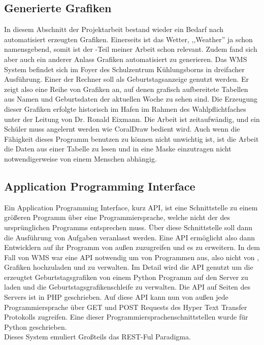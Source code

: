\subsection{Generierte Grafiken}
\label{sub:Generierte Grafiken}
In diesem Abschnitt der Projektarbeit bestand wieder ein Bedarf nach automatisiert erzeugten Grafiken.
Einerseits ist das Wetter, ,,Weather'' ja schon namensgebend, somit ist der \vs -Teil meiner Arbeit schon relevant.
Zudem fand sich aber auch ein anderer Anlass Grafiken automatisiert zu generieren.
Das WMS System befindet sich im Foyer des Schulzentrum Kühlungsborns in dreifacher Ausführung.
Einer der Rechner soll als Geburtstagsanzeige genutzt werden.
Er zeigt also eine Reihe von Grafiken an, auf denen grafisch aufbereitete Tabellen aus Namen und Geburtsdaten der aktuellen Woche zu sehen sind.
Die Erzeugung dieser Grafiken erfolgte historisch im Hafen im Rahmen des Wahlpflichtfaches unter der Leitung von Dr. Ronald Eixmann.
Die Arbeit ist zeitaufwändig, und ein Schüler muss angelernt werden wie CoralDraw bedient wird.
Auch wenn die Fähigkeit dieses Programm benutzen zu können nicht unwichtig ist, ist die Arbeit die
Daten aus einer Tabelle zu lesen und in eine Maske einzutragen nicht notwendigerweise von einem Menschen abhängig.\\

\subsection{Application Programming Interface}
\label{sub:wmsapi}
Ein Application Programming Interface, kurz API, ist eine Schnittstelle zu einem größeren Programm
über eine Programmiersprache, welche nicht der des ursprünglichen Programms entsprechen muss.
Über diese Schnittstelle soll dann die Ausführung von Aufgaben veranlasst werden.
Eine API ermöglicht also dann Entwicklern auf ihr Programm von außen zuzugreifen und es zu erweitern.
In dem Fall von WMS war eine API notwendig um von Programmen aus,
also nicht von , Grafiken hochzuladen und zu verwalten.
Im Detail wird die API genutzt um die erzeugtet Geburtstagsgrafiken von einem Python Programm auf den Server zu laden und die Geburtstagsgrafikenschleife zu verwalten.
Die API auf Seiten des Servers ist in PHP geschrieben.
Auf diese API kann nun von außen jede Programmiersprache über GET und POST Requests des Hyper Text Transfer Protokolls zugreifen.
Eine dieser Programmiersprachenschnittstellen wurde für Python geschrieben.\\
Dieses System emuliert Großteils das REST-Ful Paradigma.


